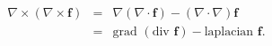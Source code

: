 \documentclass[12pt]{article}
\begin{document}
$$
{\begin{matrix}\nabla \times (\nabla \times {\mathbf  {f}})&=&\nabla (\nabla \cdot {\mathbf  {f}})-(\nabla \cdot \nabla ){\mathbf  {f}}\\&=&{\mbox{grad }}({\mbox{div }}{\mathbf  {f}})-{\mbox{laplacian }}{\mathbf  {f}}.\end{matrix}}
$$
\end{document}
